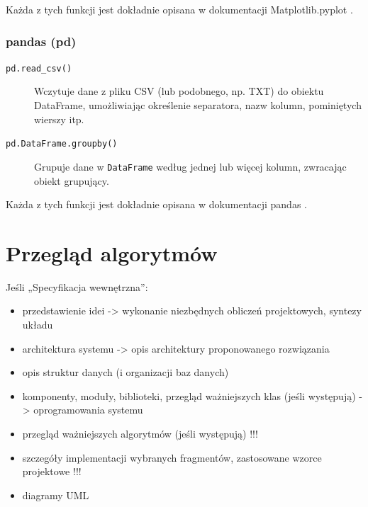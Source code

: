 \documentclass[a4paper,twoside,12pt]{book}
\begin{document}
Każda z tych funkcji jest dokładnie opisana w dokumentacji Matplotlib.pyplot \cite{bib:matplotlib-pyplot-funkcje}.

\subsubsection{pandas (pd)}

\begin{description}
	\item[\texttt{pd.read\_csv()}] Wczytuje dane z pliku CSV (lub podobnego, np. TXT) do obiektu DataFrame, umożliwiając określenie separatora, nazw kolumn, pominiętych wierszy itp.
	\item[\texttt{pd.DataFrame.groupby()}] Grupuje dane w \texttt{DataFrame} według jednej lub więcej kolumn, zwracając obiekt grupujący.
\end{description}

Każda z tych funkcji jest dokładnie opisana w dokumentacji pandas \cite{bib:pandas-funkcje}.

\section{Przegląd algorytmów}
\label{sec:Przegląd-algorytmow}











Jeśli „Specyfikacja wewnętrzna”:
\begin{itemize}
\item przedstawienie idei -> wykonanie niezbędnych obliczeń projektowych, syntezy układu
\item architektura systemu -> opis architektury proponowanego rozwiązania
\item opis struktur danych (i organizacji baz danych)
\item komponenty, moduły, biblioteki, przegląd ważniejszych klas (jeśli występują) -> oprogramowania systemu
\item przegląd ważniejszych algorytmów (jeśli występują) !!!
\item szczegóły implementacji wybranych fragmentów, zastosowane wzorce projektowe !!!
\item diagramy UML
\end{itemize}



\end{document}
